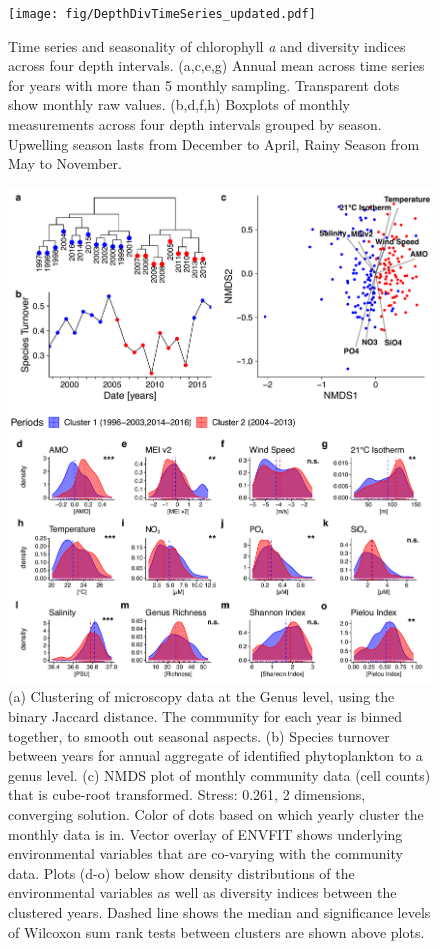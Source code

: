 \documentclass[draft]{agujournal2019}
\begin{document}
\begin{figure}
\begin{center}
\noindent\texttt{[image: fig/DepthDivTimeSeries\_updated.pdf]}
\end{center}
\caption{Time series and seasonality of chlorophyll \textit{a} and diversity indices across four depth intervals. (a,c,e,g) Annual mean across time series for years with more than 5 monthly sampling. Transparent dots show monthly raw values. (b,d,f,h) Boxplots of monthly measurements across four depth intervals grouped by season. Upwelling season lasts from December to April, Rainy Season from May to November.}
\label{fig:divts}
\end{figure}



\begin{figure}
\noindent\includegraphics[width=\textwidth]{fig/ClusteringCompPlot_NEW 2.pdf}
\caption{(a) Clustering of microscopy data at the Genus level, using the binary Jaccard distance. The community for each year is binned together, to smooth out seasonal aspects. (b) Species turnover between years for annual aggregate of identified phytoplankton to a genus level. (c) NMDS plot of monthly community data (cell counts) that is cube-root transformed. Stress: 0.261, 2 dimensions, converging solution. Color of dots based on which yearly cluster the monthly data is in. Vector overlay of ENVFIT shows underlying environmental variables that are co-varying with the community data.
Plots (d-o) below show density distributions of the environmental variables as well as diversity indices between the clustered years. Dashed line shows the median and significance levels of Wilcoxon sum rank tests between clusters are shown above plots.}
\label{fig:clustering}
\end{figure}
\end{document}
